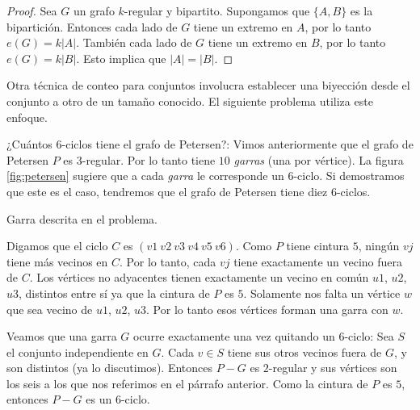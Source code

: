 \begin{proof}
    Sea $G$ un grafo $k$-regular y bipartito. Supongamos que $\{A, B\}$ es la bipartición. Entonces cada lado de $G$ tiene un extremo en $A$, por lo tanto $e(G) = k|A|$. También cada lado de $G$ tiene un extremo en $B$, por lo tanto $e(G) = k|B|$. Esto implica que $|A| = |B|$.
\end{proof}

Otra técnica de conteo para conjuntos involucra establecer una biyección desde el conjunto a otro de un tamaño conocido. El siguiente problema utiliza este enfoque.

\begin{prob}
    ¿Cuántos $6$-ciclos tiene el grafo de Petersen?: Vimos anteriormente que el grafo de Petersen $P$ es $3$-regular. Por lo tanto tiene $10$ \textit{garras} (una por vértice). La figura \ref{fig:petersen} sugiere que a cada \textit{garra} le corresponde un $6$-ciclo. Si demostramos que este es el caso, tendremos que el grafo de Petersen tiene diez $6$-ciclos.
    
    \begin{marginfigure}
        \centering
        \caption{Garra descrita en el problema.}
        \label{fig:garra}
    \end{marginfigure}
    
    Digamos que el ciclo $C$ es $(v1~v2~v3~v4~v5~v6)$. Como $P$ tiene cintura $5$, ningún $vj$ tiene más vecinos en $C$. Por lo tanto, cada $vj$ tiene exactamente un vecino fuera de $C$. Los vértices no adyacentes tienen exactamente un vecino en común $u1$, $u2$, $u3$, distintos entre sí ya que la cintura de $P$ es $5$. Solamente nos falta un vértice $w$ que sea vecino de $u1$, $u2$, $u3$. Por lo tanto esos vértices forman una garra con $w$.
    
    Veamos que una garra $G$ ocurre exactamente una vez quitando un $6$-ciclo: Sea $S$ el conjunto independiente en $G$. Cada $v \in S$ tiene sus otros vecinos fuera de $G$, y son distintos (ya lo discutimos). Entonces $P-G$ es $2$-regular y sus vértices son los seis a los que nos referimos en el párrafo anterior. Como la cintura de $P$ es $5$, entonces $P - G$ es un $6$-ciclo.
\end{prob}

